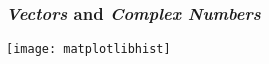 \begin{frame}[fragile]\frametitle{\emph{Vectors} and \emph{Complex Numbers}}
\begin{center}
\texttt{[image: matplotlibhist]}
\end{center}
\end{frame}